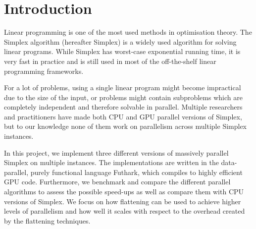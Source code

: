 \section{Introduction}
Linear programming is one of the most used methods in optimisation theory. The Simplex algorithm (hereafter Simplex) is a widely used algorithm for solving linear programs. While Simplex has worst-case exponential running time, it is very fast in practice and is still used in most of the off-the-shelf linear programming frameworks.

For a lot of problems, using a single linear program might become impractical due to the size of the input, or problems might contain subproblems which are completely independent and therefore solvable in parallel. Multiple researchers and practitioners have made both CPU and GPU parallel versions of Simplex, but to our knowledge none of them work on parallelism across multiple Simplex instances.

\newpar In this project, we implement three different versions of massively parallel Simplex on multiple instances. The implementations are written in the data-parallel, purely functional language Futhark, which compiles to highly efficient GPU code. Furthermore, we benchmark and compare the different parallel algorithms to assess the possible speed-ups as well as compare them with CPU versions of Simplex. We focus on how flattening can be used to achieve higher levels of parallelism and how well it scales with respect to the overhead created by the flattening techniques.

